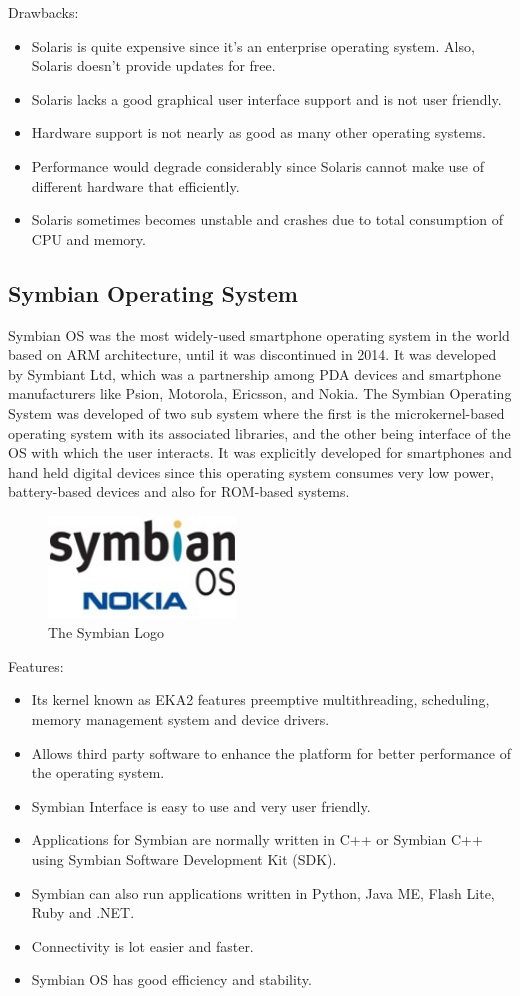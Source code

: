 \documentclass[11pt,a4paper,twoside]{article}
\begin{document}
Drawbacks:
\begin{itemize}
\item Solaris is quite expensive since it’s an enterprise operating system. Also, Solaris doesn’t provide updates for free.
\item Solaris lacks a good graphical user interface support and is not user friendly.
\item Hardware support is not nearly as good as many other operating systems.
\item Performance would degrade considerably since Solaris cannot make use of different hardware that efficiently.
\item Solaris sometimes becomes unstable and crashes due to total consumption of CPU and memory.
\end{itemize}
\subsection{Symbian Operating System}
Symbian OS was the most widely-used smartphone operating system in the world based on ARM architecture, until it was discontinued in 2014. It was developed by Symbiant Ltd, which was a partnership among PDA devices and smartphone manufacturers like Psion, Motorola, Ericsson, and Nokia. The Symbian Operating System was developed of two sub system where the first is the microkernel-based operating system with its associated libraries, and the other being interface of the OS with which the user interacts. It was explicitly developed for smartphones and hand held digital devices since this operating system consumes very low power, battery-based devices and also for ROM-based systems.\\
\begin{figure}
\includegraphics[width=5cm]{Fig 7.jpg}
\caption{The Symbian Logo}
\end{figure}
Features:
\begin{itemize}
    \item Its kernel known as EKA2 features preemptive multithreading, scheduling, memory management system and device drivers.
\item Allows third party software to enhance the platform for better performance of the operating system.
\item Symbian Interface is easy to use and very user friendly.
\item Applications for Symbian are normally written in C++ or Symbian C++ using Symbian Software Development Kit (SDK).
\item Symbian can also run applications written in Python, Java ME, Flash Lite, Ruby and .NET.
\item Connectivity is lot easier and faster.
\item Symbian OS has good efficiency and stability.
\end{itemize}
\end{document}
